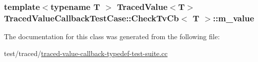 \subsubsection[{\texorpdfstring{m\+\_\+value}{m_value}}]{\setlength{\rightskip}{0pt plus 5cm}template$<$typename T $>$ {\bf Traced\+Value}$<$T$>$ {\bf Traced\+Value\+Callback\+Test\+Case\+::\+Check\+Tv\+Cb}$<$ T $>$\+::m\+\_\+value\hspace{0.3cm}{\ttfamily [private]}}\hypertarget{classTracedValueCallbackTestCase_1_1CheckTvCb_af7cf27a79d15c631a58b9838ee664f3f}{}\label{classTracedValueCallbackTestCase_1_1CheckTvCb_af7cf27a79d15c631a58b9838ee664f3f}


The documentation for this class was generated from the following file\+:\begin{DoxyCompactItemize}
\item 
test/traced/\hyperlink{traced-value-callback-typedef-test-suite_8cc}{traced-\/value-\/callback-\/typedef-\/test-\/suite.\+cc}\end{DoxyCompactItemize}
